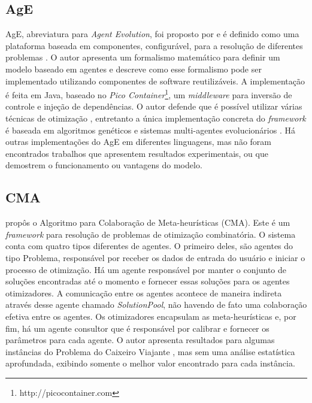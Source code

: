 \subsection{AgE}
AgE, abreviatura para \textit{Agent Evolution}, foi proposto por  e é definido como uma plataforma baseada em componentes, configurável, para a resolução de diferentes problemas \cite{piketak2009functional}. O autor apresenta um formalismo matemático para definir um modelo baseado em agentes e descreve como esse formalismo pode ser implementado utilizando componentes de software reutilizáveis. A implementação é feita em Java, baseado no \textit{Pico Container}\footnote{http://picocontainer.com}, um \textit{middleware} para inversão de controle e injeção de dependências. O autor defende que é possível utilizar várias técnicas de otimização \cite{piketak2013agent}, entretanto a única implementação concreta do \textit{framework} é baseada em algoritmos genéticos e sistemas multi-agentes evolucionários \cite{kisiel2004agent}. Há outras implementações do AgE em diferentes linguagens, mas não foram encontrados trabalhos que apresentem resultados experimentais, ou que demostrem o funcionamento ou vantagens do modelo. 

\subsection{CMA}
 propôs o Algoritmo para Colaboração de Meta-heurísticas (CMA). Este é um \textit{framework} para resolução de problemas de otimização combinatória. O sistema conta com quatro tipos diferentes de agentes. O primeiro deles, são agentes do tipo Problema, responsável por receber os dados de entrada do usuário e iniciar o processo de otimização. Há um agente responsável por manter o conjunto de soluções encontradas até o momento e fornecer essas soluções para os agentes otimizadores. A comunicação entre os agentes acontece de maneira indireta através desse agente chamado \textit{SolutionPool}, não havendo de fato uma colaboração efetiva entre os agentes. Os otimizadores encapsulam as meta-heurísticas e, por fim, há um agente consultor que é responsável por calibrar e fornecer os parâmetros para cada agente. O autor apresenta resultados para algumas instâncias do Problema do Caixeiro Viajante \cite{malek2010}, mas sem uma análise estatística aprofundada, exibindo somente o melhor valor encontrado para cada instância. 

